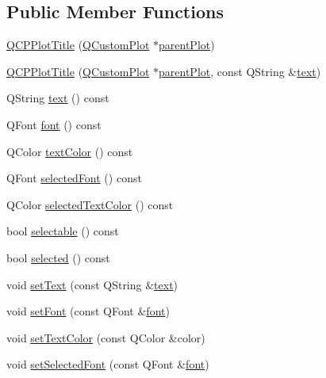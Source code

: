 \subsection*{Public Member Functions}
\begin{DoxyCompactItemize}
\item 
\hyperlink{class_q_c_p_plot_title_aaae17bee2de6d6a1e695f76fb1abed03}{Q\+C\+P\+Plot\+Title} (\hyperlink{class_q_custom_plot}{Q\+Custom\+Plot} $\ast$\hyperlink{class_q_c_p_layerable_ab7e0e94461566093d36ffc0f5312b109}{parent\+Plot})
\item 
\hyperlink{class_q_c_p_plot_title_a90b9f46ceccbeee41f71c895a8c7ee1f}{Q\+C\+P\+Plot\+Title} (\hyperlink{class_q_custom_plot}{Q\+Custom\+Plot} $\ast$\hyperlink{class_q_c_p_layerable_ab7e0e94461566093d36ffc0f5312b109}{parent\+Plot}, const Q\+String \&\hyperlink{class_q_c_p_plot_title_aeaa6f2384a611e8a610262b976b3cee5}{text})
\item 
Q\+String \hyperlink{class_q_c_p_plot_title_aeaa6f2384a611e8a610262b976b3cee5}{text} () const 
\item 
Q\+Font \hyperlink{class_q_c_p_plot_title_aa5f4cf007db51ccdd1c137191f564119}{font} () const 
\item 
Q\+Color \hyperlink{class_q_c_p_plot_title_a69f2cae768ff84dbf9f8a387ad617781}{text\+Color} () const 
\item 
Q\+Font \hyperlink{class_q_c_p_plot_title_aa865a3656e01ee8db41837afa892f2a3}{selected\+Font} () const 
\item 
Q\+Color \hyperlink{class_q_c_p_plot_title_ab2262e40edfc41540c1dbc1c4234f9d2}{selected\+Text\+Color} () const 
\item 
bool \hyperlink{class_q_c_p_plot_title_a8d75c7cbcf2049c9512a3335d6f11416}{selectable} () const 
\item 
bool \hyperlink{class_q_c_p_plot_title_a9771f3a4bca026484d7c8b5d953b5e82}{selected} () const 
\item 
void \hyperlink{class_q_c_p_plot_title_aae5a93e88050dfb2cbf6adc087516821}{set\+Text} (const Q\+String \&\hyperlink{class_q_c_p_plot_title_aeaa6f2384a611e8a610262b976b3cee5}{text})
\item 
void \hyperlink{class_q_c_p_plot_title_a199fc7170802ea65006c371875349e37}{set\+Font} (const Q\+Font \&\hyperlink{class_q_c_p_plot_title_aa5f4cf007db51ccdd1c137191f564119}{font})
\item 
void \hyperlink{class_q_c_p_plot_title_a71273e3a0ca6b4c151591b37b9e5ce33}{set\+Text\+Color} (const Q\+Color \&color)
\item 
void \hyperlink{class_q_c_p_plot_title_a5245980ead999ceed51dbe702d0e3131}{set\+Selected\+Font} (const Q\+Font \&\hyperlink{class_q_c_p_plot_title_aa5f4cf007db51ccdd1c137191f564119}{font})

\end{DoxyCompactItemize}
